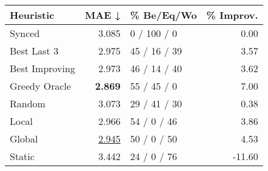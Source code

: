 \begin{tabular}{lrlr}
\toprule
\textbf{Heuristic} & \textbf{MAE ↓} & \textbf{\% Be/Eq/Wo} & \textbf{\% Improv.} \\
\midrule
            Synced &          3.085 &          0 / 100 / 0 &                0.00 \\
\midrule
       Best Last 3 &          2.975 &         45 / 16 / 39 &                3.57 \\
    Best Improving &          2.973 &         46 / 14 / 40 &                3.62 \\
\addlinespace
     Greedy Oracle &          \textbf{2.869} &          55 / 45 / 0 &                7.00 \\
            Random &          3.073 &         29 / 41 / 30 &                0.38 \\
\midrule
             Local &          2.966 &          54 / 0 / 46 &                3.86 \\
            Global &          \underline{2.945} &          50 / 0 / 50 &                4.53 \\
\midrule
            Static &          3.442 &          24 / 0 / 76 &              -11.60 \\
\bottomrule
\end{tabular}

\label{tab:ds_non_lr05_le2_bs2_Summary}
